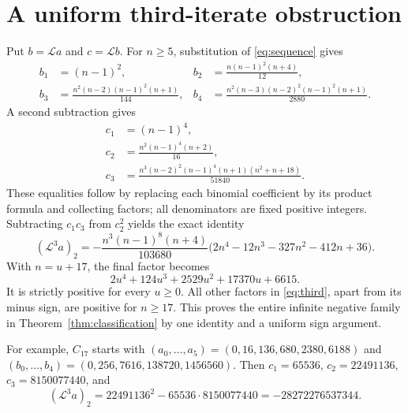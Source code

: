 \section{A uniform third-iterate obstruction}
Put $b=\mathcal La$ and $c=\mathcal Lb$. For $n\ge5$, substitution of
\eqref{eq:sequence} gives
\begin{align*}
b_1&=(n-1)^2,&
b_2&=\frac{n(n-1)^2(n+4)}{12},\\
b_3&=\frac{n^2(n-2)(n-1)^2(n+1)}{144},&
b_4&=\frac{n^2(n-3)(n-2)^2(n-1)^2(n+1)}{2880}.
\end{align*}
A second subtraction gives
\begin{align*}
c_1&=(n-1)^4,\\
c_2&=\frac{n^2(n-1)^4(n+2)}{16},\\
c_3&=\frac{n^3(n-2)^2(n-1)^4(n+1)(n^2+n+18)}{51840}.
\end{align*}
These equalities follow by replacing each binomial coefficient by its
product formula and collecting factors; all denominators are fixed positive
integers. Subtracting $c_1c_3$ from $c_2^2$ yields the exact identity
\begin{equation}\label{eq:third}
 (\mathcal L^3a)_2
 =-\frac{n^3(n-1)^8(n+4)}{103680}
       \bigl(2n^4-12n^3-327n^2-412n+36\bigr).
\end{equation}
With $n=u+17$, the final factor becomes
\[
 2u^4+124u^3+2529u^2+17370u+6615.
\]
It is strictly positive for every $u\ge0$. All other factors in
\eqref{eq:third}, apart from its minus sign, are positive for $n\ge17$.
This proves the entire infinite negative family in Theorem~\ref{thm:classification}
by one identity and a uniform sign argument.

For example, $C_{17}$ starts with
$(a_0,\ldots,a_5)=(0,16,136,680,2380,6188)$ and
$(b_0,\ldots,b_4)=(0,256,7616,138720,1456560)$.
Then $c_1=65536$, $c_2=22491136$, $c_3=8150077440$, and
\[
 (\mathcal L^3a)_2=22491136^2-65536\cdot8150077440
                 =-28272276537344.
\]

